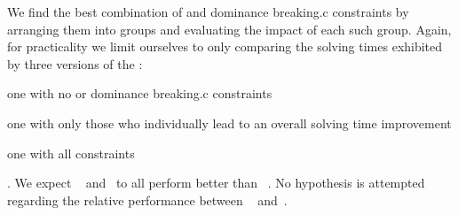 We find the best combination of  and
\gls{dominance breaking.c} \glspl{constraint} by arranging them into groups and
evaluating the impact of each such group.
%
Again, for practicality we limit ourselves to only comparing the solving times
exhibited by three versions of the :
%
\begin{modelList}
  \item {}
    one with no  or \gls{dominance breaking.c}
    \glspl{constraint}
  \item {}
    one with only those who individually lead to an overall solving time
    improvement
  \item {}
    one with all \glspl{constraint}
\end{modelList}.
%
We expect ~
and~ to all perform better than ~.
%
No hypothesis is attempted regarding the relative performance between
~
and~.

